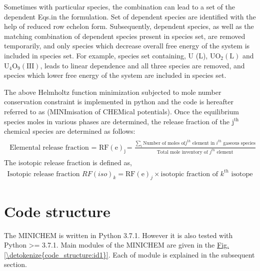 \documentclass[letterpaper,10pt,english]{sphinxmanual}
\begin{document}
Sometimes with particular species, the combination can lead to a set of the
dependent Eqs.in the formulation. Set of dependent species are identified
with the help of reduced row echelon form. Subsequently, dependent species, as
well as the matching combination of dependent species present in species set,
are removed temporarily, and only species which decrease overall free energy
of the system is included in species set. For example, species set containing,
U (L), \(\mathrm{UO_{2}(L)}\) and \(\mathrm{U_4O_9(III)}\),
leads to linear dependence and all three species are removed, and species
which lower free energy of the system are included in species set.

The above Helmholtz function minimization subjected to mole number
conservation constraint is implemented in python and the code is hereafter
referred to as  (MINImisation of CHEMical potentials). Once the equilibrium species moles in various
phases are determined, the release fraction of
the \(\mathrm{j^{th}}\) chemical species are determined as follows:
\begin{equation*}
\begin{split}\begin{align}
\text{Elemental release fraction = }\mathrm{{RF(e)}_j} &=
\frac{{\sum\limits}_{i} \text{Number of moles of
\(j^{th}\) element in \(i^{th}\) gaseous species}}{\text{Total mole
inventory of \(j^{th}\) element}}
\end{align}\end{split}
\end{equation*}
The isotopic release fraction is defined as,
\begin{equation*}
\begin{split}\text{Isotopic release fraction }{RF(iso)}_k = {\mathrm{RF(e)}_j} \times
\text{isotopic fraction of \(k^{th}\) isotope}\end{split}
\end{equation*}

\chapter{Code structure}
\label{\detokenize{code_structure:code-structure}}\label{\detokenize{code_structure::doc}}
The MINICHEM is written in Python 3.7.1. However it is also tested with
Python \textgreater{}= 3.7.1. Main modules of the MINICHEM are given in the
\hyperref[\detokenize{code_structure:id1}]{Fig.\@ \ref{\detokenize{code_structure:id1}}}. Each of module is explained in the subsequent section.
\end{document}
